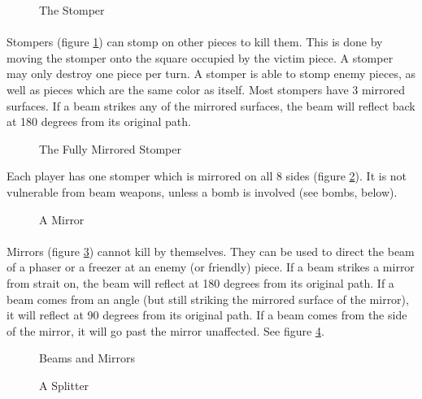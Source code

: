 \begin{figure}[htb]
	\caption{The Stomper}
	\label{pstomper}
\end{figure}

\paragraph[]{}
Stompers (figure \ref{pstomper}) can stomp on other pieces to kill
them.  This is done by moving the stomper onto the square occupied by
the victim piece.  A stomper may only destroy one piece per turn.  A
stomper is able to stomp enemy pieces, as well as pieces which are the
same color as itself.  Most stompers have 3 mirrored surfaces.  If a
beam strikes any of the mirrored surfaces, the beam will reflect back
at 180 degrees from its original path.

\begin{figure}[htb]
	\caption{The Fully Mirrored Stomper}
	\label{fstomper}
\end{figure}

Each player has one stomper which is mirrored on all 8 sides (figure
\ref{fstomper}).  It is not vulnerable from beam weapons, unless a
bomb is involved (see bombs, below).

\begin{figure}[htb]
	\caption{A Mirror}
	\label{mirror}
\end{figure}

\paragraph[]{}
Mirrors (figure \ref{mirror}) cannot kill by themselves.  They can be
used to direct the beam of a phaser or a freezer at an enemy (or
friendly) piece.  If a beam strikes a mirror from strait on, the beam
will reflect at 180 degrees from its original path.  If a beam comes
from an angle (but still striking the mirrored surface of the mirror),
it will reflect at 90 degrees from its original path.  If a beam comes
from the side of the mirror, it will go past the mirror unaffected.
See figure \ref{mirror_ex}.

\begin{figure}[htb]
	\caption{Beams and Mirrors}
	\label{mirror_ex}
\end{figure}


\begin{figure}[htb]
	\caption{A Splitter}
	\label{splitter}
\end{figure}

